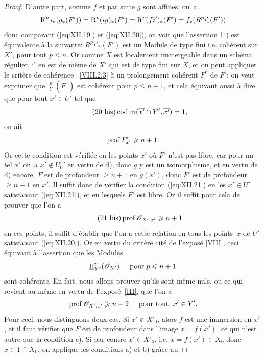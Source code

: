 \begin{proof}
D'autre part, comme $f$ et par suite $g$ sont affines, on~a
\steco
\begin{equation} \label{eq:XII.20} {}\operatorname{R}^pi_\ast(g_\ast(F')) = \operatorname{R}^p(ig)_\ast(F') = \operatorname{R}^p(fi')_\ast(F') = f_\ast(R^pi'_\ast(F'))
\end{equation}
donc comparant (\ref{eq:XII.19}) et (\ref{eq:XII.20}), on voit que l'assertion 1${}^\circ$) est \'equivalente \`a la suivante: $R^pi'_\ast(F')$ est un Module de type fini i.e. coh\'erent sur $X'$, pour tout $p\leq n$. Or comme $X$ est localement immergeable dans un sch\'ema r\'egulier, il en est de m\^eme de $X'$ qui est de type fini sur $X$, et on peut appliquer le crit\`ere de coh\'erence \ignorespaces~\ref{VIII.2.3} \`a un prolongement coh\'erent $F^{''}$ de $F'$: on veut exprimer que $\mathop{\underline{\mathrm{H}}}\nolimits^p_Y(F^{''})$ est coh\'erent pour $p\leq n+1$, et cela \'equivaut aussi \`a dire que pour tout $x'\in U'$ tel que
\begin{equation*} \label{eq:XII.20bis} \tag{20 bis} {}\operatorname{codim} (\overline{x'}\cap Y', \overline{x'})=1,
\end{equation*}
on ait
\steco
\begin{equation} \label{eq:XII.21} {} \operatorname{prof} F'_{x'}\geqslant n+1.
\end{equation}
Or cette condition est v\'erifi\'ee en les points $x'$ o\`u $F'$ n'est pas libre, car pour un tel $x'$ on~a $x'\notin U_0'$ en vertu de d), donc $g$ y est un isomorphisme, et en vertu de d) encore, $F$ est de profondeur $\geq n+1$ en $g(x')$, donc $F'$ est de profondeur $\geq n+1$ en $x'$. Il suffit donc de v\'erifier la condition (\ref{eq:XII.21}) en les $x'\in U'$ satisfaisant (\ref{eq:XII.21}), et en lesquels $F'$ est libre. Or il suffit pour cela de prouver que l'on a
\begin{equation*} \label{eq:XII.21bis} \tag{21 bis}
\operatorname{prof} {\mathscr O}_{X', x'}\geqslant n+1
\end{equation*}
\enlargethispage{\baselineskip}%
en ces points, \afortiori il suffit d'\'etablir que l'on a cette relation en tous les points~$x$ de $U'$ satisfaisant (\ref{eq:XII.20}). Or en vertu du crit\`ere cit\'e de l'expos\'e \ref{VIII}, ceci \'equivaut \`a l'assertion que les Modules
\[
\mathop{\underline{\mathrm{H}}}\nolimits^p_{Y'}({\mathscr O}_{X'}) \hspace{5mm} \text{pour} \; p\leqslant n+1
\]
sont coh\'erents. En fait, nous allons prouver qu'ils sont m\^eme nuls, ou ce qui revient au m\^eme en vertu de l'expos\'e~\ref{III}, que l'on a
\steco
\begin{equation} \label{eq:XII.22} {} \operatorname{prof} {\mathscr O}_{X', x'}\geqslant n+2 \hspace{5mm} \text{pour tout }\; x'\in Y'.
\end{equation}
Pour ceci, nous distinguons deux cas. Si $x'\notin X'_0$, alors $f$ est une immersion en $x'$, et il faut v\'erifier que $F$ est de profondeur dans l'image $x=f(x')$, ce qui n'est autre que la condition c). Si par contre $x'\in X'_0$, i.e. $x=f(x')\in X_0$ donc $x\in Y\cap X_0$, on applique les conditions a) et b) gr\^ace au


\end{proof}
